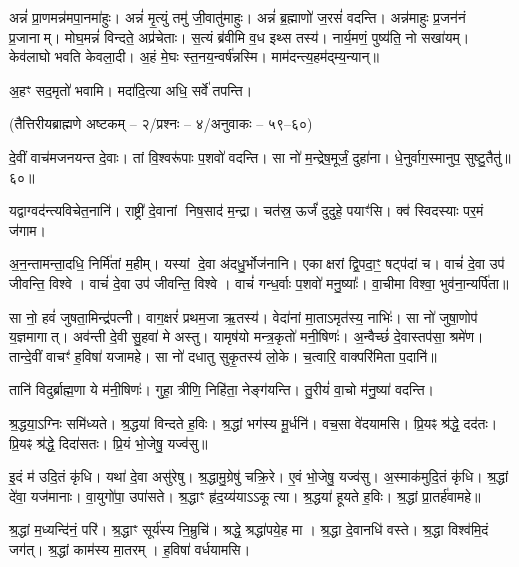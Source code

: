 अन्नं॑ प्रा॒णमन्न॑मपा॒नमा॑हुः।
अन्नं॑ मृ॒त्युं तमु॑ जी॒वातु॑माहुः।
अन्नं॑ ब्र॒ह्माणो॑ ज॒रसं॑  वदन्ति।
अन्न॑माहुः प्र॒जन॑नं प्र॒जानाम्।
मोघ॒मन्नं॑ विन्दते॒ अप्र॑चेताः।
स॒त्यं ब्र॑वीमि व॒ध इथ्स तस्य॑।
नार्य॒मणं॒ पुष्य॑ति॒ नो सखा॑यम्।
केव॑लाघो भवति केवला॒दी।
अ॒हं मे॒घः स्त॒नय॒न्वर्\mbox{}ष॑न्नस्मि।
माम॑दन्त्य॒हम॑द्म्य॒न्यान्॥

अ॒हꣳ सद॒मृतो॑ भवामि।
मदा॑दि॒त्या अधि॒ सर्वे॑ तपन्ति।

\centerline{\scriptsize (तैत्तिरीयब्राह्मणे अष्टकम् – २/प्रश्नः – ४/अनुवाकः – ५९–६०)}

दे॒वीं वाच॑मजनयन्त दे॒वाः।
तां वि॒श्वरू॑पाः प॒शवो॑ वदन्ति।
सा नो॑ म॒न्द्रेष॒मूर्जं॒ दुहा॑ना।
धे॒नुर्वाग॒स्मानुप॒ सुष्टु॒तैतु॑॥६०॥


यद्वाग्वद॑न्त्यविचेत॒नानि॑।
राष्ट्री॑ दे॒वानां निष॒साद॑ म॒न्द्रा।
चत॑स्र॒ ऊर्जं॑ दुदुहे॒ पयाꣳ॑सि।
क्व॑ स्विदस्याः पर॒मं ज॑गाम।

\closesection

अ॒न॒न्तामन्ता॒दधि॒ निर्मि॑तां म॒हीम्।
यस्यां दे॒वा अ॑दधु॒र्भोज॑नानि।
एकाक्षरां द्वि॒पदा॒ꣳ॒ षट्प॑दां च।
वाचं॑ दे॒वा उप॑ जीवन्ति॒ विश्वे।
वाचं॑ दे॒वा उप॑ जीवन्ति॒ विश्वे।
वाचं॑ गन्ध॒र्वाः प॒शवो॑ मनु॒ष्याः᳚।
वा॒चीमा विश्वा॒ भुव॑ना॒न्यर्पि॑ता॥

सा नो॒ हवं॑ जुषता॒मिन्द्र॑पत्नी।
वाग॒क्षरं॑ प्रथम॒जा ऋ॒तस्य॑।
वेदा॑नां मा॒ताऽमृत॑स्य॒ नाभिः॑।
सा नो॑ जुषा॒णोप॑ य॒ज्ञमागात्।
अव॑न्ती दे॒वी सु॒हवा॑ मे अस्तु।
यामृष॑यो मन्त्र॒कृतो॑ मनी॒षिणः॑।
अ॒न्वैच्छं॑ दे॒वास्तप॑सा॒ श्रमे॑ण।
तान्दे॒वीं वाचꣳ॑ ह॒विषा॑ यजामहे।
सा नो॑ दधातु सुकृ॒तस्य॑ लो॒के।
च॒त्वारि॒ वाक्परि॑मिता प॒दानि॑॥

तानि॑ विदुर्ब्राह्म॒णा ये म॑नी॒षिणः॑।
गुहा॒ त्रीणि॒ निहि॑ता॒ नेङ्ग॑यन्ति।
तु॒रीयं॑ वा॒चो म॑नु॒ष्या॑ वदन्ति।


श्र॒द्धया॒ऽग्निः समि॑ध्यते।
श्र॒द्धया॑ विन्दते ह॒विः।
श्र॒द्धां भग॑स्य मू॒र्धनि॑।
वच॒सा वे॑दयामसि।
प्रि॒यꣴ श्र॑द्धे॒ दद॑तः।
प्रि॒यꣴ श्र॑द्धे॒ दिदा॑सतः।
प्रि॒यं भो॒जेषु॒ यज्व॑सु॥

इ॒दं म॑ उदि॒तं कृ॑धि।
यथा॑ दे॒वा असु॑रेषु।
श्र॒द्धामु॒ग्रेषु॑ चक्रि॒रे।
ए॒वं भो॒जेषु॒ यज्व॑सु।
अ॒स्माक॑मुदि॒तं कृ॑धि।
श्र॒द्धां दे॑वा॒ यज॑मानाः।
वा॒युगो॑पा॒ उपा॑सते।
श्र॒द्धाꣳ हृ॑द॒य्य॑याऽऽकूत्या।
श्र॒द्धया॑ हूयते ह॒विः।
श्र॒द्धां प्रा॒तर्\mbox{}ह॑वामहे॥

श्र॒द्धां म॒ध्यन्दि॑नं॒ परि॑।
श्र॒द्धाꣳ सूर्य॑स्य नि॒म्रुचि॑।
श्रद्धे॒ श्रद्धा॑पये॒ह मा।
श्र॒द्धा दे॒वानधि॑ वस्ते।
श्र॒द्धा विश्व॑मि॒दं जग॑त्।
श्र॒द्धां काम॑स्य मा॒तरम्।
ह॒विषा॑ वर्धयामसि।

